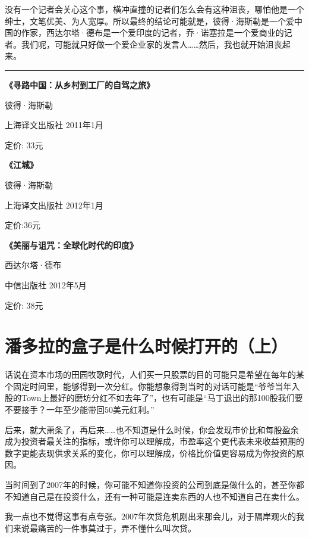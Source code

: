 没有一个记者会关心这个事，横冲直撞的记者们怎么会有这种沮丧，哪怕他是一个绅士，文笔优美、为人宽厚。所以最终的结论可能就是，彼得·海斯勒是一个爱中国的作家，西达尔塔·德布是一个爱印度的记者，乔·诺塞拉是一个爱商业的记者。我们呢，可能就只好做一个爱企业家的发言人\ldots\ldots 然后，我也就开始沮丧起来。

\begin{center}\rule{0.5\linewidth}{0.5pt}\end{center}

\textbf{《寻路中国：从乡村到工厂的自驾之旅》}

彼得·海斯勒

上海译文出版社 2011年1月

定价: 33元

\textbf{《江城》}

彼得·海斯勒

上海译文出版社 2012年1月

定价:36元

\textbf{《美丽与诅咒：全球化时代的印度》}

西达尔塔·德布

中信出版社 2012年5月

定价: 38元

\hypertarget{ux6f58ux591aux62c9ux7684ux76d2ux5b50ux662fux4ec0ux4e48ux65f6ux5019ux6253ux5f00ux7684ux4e0a}{%
\section{潘多拉的盒子是什么时候打开的（上）}\label{ux6f58ux591aux62c9ux7684ux76d2ux5b50ux662fux4ec0ux4e48ux65f6ux5019ux6253ux5f00ux7684ux4e0a}}

话说在资本市场的田园牧歌时代，人们买一只股票的目的可能只是希望在每年的某个固定时间里，能够得到一次分红。你能想象得到当时的对话可能是``爷爷当年入股的Town上最好的磨坊分红不如去年了''，也有可能是``马丁退出的那100股我们要不要接手？一年至少能带回50美元红利。''

后来，就大萧条了，再后来\ldots\ldots 也不知道是什么时候，你会发现市价比和每股盈余成为投资者最关注的指标，或许你可以理解成，市盈率这个更代表未来收益预期的数字更能表现供求关系的变化，你可以理解成，价格比价值更容易成为你投资的原因。

当时间到了2007年的时候，你可能不知道你投资的公司到底是做什么的，甚至你都不知道自己是在投资什么，还有一种可能是连卖东西的人也不知道自己在卖什么。

我一点也不觉得这事有点夸张。2007年次贷危机刚出来那会儿，对于隔岸观火的我们来说最痛苦的一件事莫过于，弄不懂什么叫次贷。

